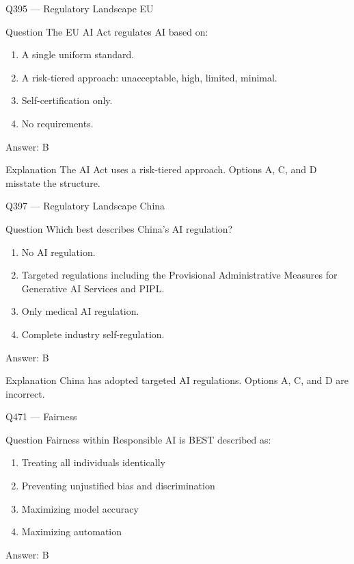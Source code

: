 \documentclass[aspectratio=169,8pt]{beamer}
\begin{document}
	\begin{frame}{Q395 --- Regulatory Landscape EU}
		\begin{block}{Question}
			The EU AI Act regulates AI based on:
			\begin{enumerate}
				\item A single uniform standard.
				\item A risk-tiered approach: unacceptable, high, limited, minimal.
				\item Self-certification only.
				\item No requirements.
			\end{enumerate}
		\end{block}
		\begin{exampleblock}{Answer: B}\end{exampleblock}
		\begin{block}{Explanation}
			The AI Act uses a risk-tiered approach. Options A, C, and D misstate the structure.
		\end{block}
	\end{frame}
	

	\begin{frame}{Q397 --- Regulatory Landscape China}
		\begin{block}{Question}
			Which best describes China's AI regulation?
			\begin{enumerate}
				\item No AI regulation.
				\item Targeted regulations including the Provisional Administrative Measures for Generative AI Services and PIPL.
				\item Only medical AI regulation.
				\item Complete industry self-regulation.
			\end{enumerate}
		\end{block}
		\begin{exampleblock}{Answer: B}\end{exampleblock}
		\begin{block}{Explanation}
			China has adopted targeted AI regulations. Options A, C, and D are incorrect.
		\end{block}
	\end{frame}
	

	
	\begin{frame}{Q471 --- Fairness} \begin{block}{Question} Fairness within Responsible AI is BEST described as: \begin{enumerate} \item Treating all individuals identically \item Preventing unjustified bias and discrimination \item Maximizing model accuracy \item Maximizing automation \end{enumerate} \end{block} \begin{exampleblock}{Answer: B}\end{exampleblock} \end{frame}
	
\end{document}
